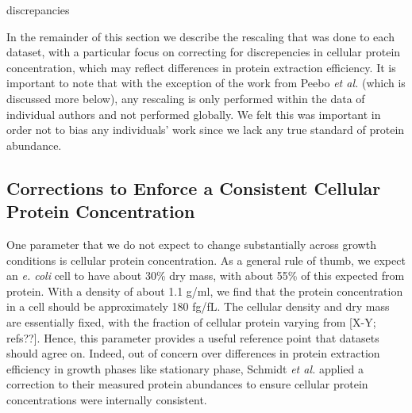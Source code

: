 discrepancies \documentclass[11pt, letterpaper]{article}
\begin{document}
In the remainder of this section we describe the rescaling that was done to each
dataset, with a particular focus on correcting for discrepencies in cellular
protein concentration, which may reflect differences in protein extraction
efficiency. It is important to note that with the exception of the work from
Peebo {\it et al.} (which is discussed more below), any rescaling is only
performed within the data of individual authors and not performed globally. We
felt this was important in order not to bias any individuals' work since we lack
any true standard of protein abundance.



\subsection{Corrections to Enforce a Consistent Cellular Protein Concentration}


One parameter that we do not expect to change substantially across growth
conditions is cellular protein concentration. As a general rule of thumb, we
expect an {\it e. coli} cell to have about 30\% dry mass, with about 55\% of
this expected from protein. With a density of about 1.1 g/ml, we find that the
protein concentration in a cell should be approximately 180 fg/fL.  The cellular
density and dry mass are essentially fixed, with the fraction of cellular
protein varying from [X-Y; refs??]. Hence,  this parameter provides a useful
reference point that datasets should agree on.  Indeed, out of concern over
differences in protein extraction efficiency in growth phases like stationary
phase, Schmidt {\it et al.} applied a correction to their measured protein
abundances to ensure cellular protein concentrations were internally consistent.
\end{document}
